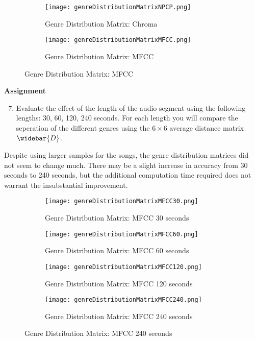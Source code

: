 \documentclass{article} %
\begin{document}
\begin{figure}[H]
\begin{subfigure}{0.5\textwidth}
\centering
\texttt{[image: genreDistributionMatrixNPCP.png]}
\caption{Genre Distribution Matrix: Chroma}
\label{fig:gDistC}
\end{subfigure}
\begin{subfigure}{0.5\textwidth}
\centering
\texttt{[image: genreDistributionMatrixMFCC.png]}
\caption{Genre Distribution Matrix: MFCC}
\label{fig:gDistM}
\end{subfigure}
\end{figure}


 

\begin{framed}
\textbf{Assignment}
\begin{enumerate}
\setcounter{enumi}{6}
\item Evaluate the effect of the length of the audio segment using the following lengths: 30, 60, 120, 240 seconds. For each length you will compare the seperation of the different genres
 using the $6 \times 6$  average distance matrix $\widebar{D}$.
\end{enumerate}
\end{framed}

Despite using larger samples for the songs, the genre distribution matrices did not seem to change much. There may be a slight increase in accuracy from 30 seconds to 240 seconds,
but the additional computation time required does not warrant the insubstantial improvement. 

\begin{figure}[H]
\begin{subfigure}{0.5\textwidth}
\centering
\texttt{[image: genreDistributionMatrixMFCC30.png]}
\caption{Genre Distribution Matrix: MFCC 30 seconds}
\label{fig:gDistM30}
\end{subfigure}
\begin{subfigure}{0.5\textwidth}
\centering
\texttt{[image: genreDistributionMatrixMFCC60.png]}
\caption{Genre Distribution Matrix: MFCC 60 seconds}
\label{fig:gDistM60}
\end{subfigure}
\begin{subfigure}{0.5\textwidth}
\centering
\texttt{[image: genreDistributionMatrixMFCC120.png]}
\caption{Genre Distribution Matrix: MFCC 120 seconds}
\label{fig:gDistM120}
\end{subfigure}
\begin{subfigure}{0.5\textwidth}
\centering
\texttt{[image: genreDistributionMatrixMFCC240.png]}
\caption{Genre Distribution Matrix: MFCC 240 seconds}
\label{fig:gDistM240}
\end{subfigure}
\end{figure}
\end{document}
